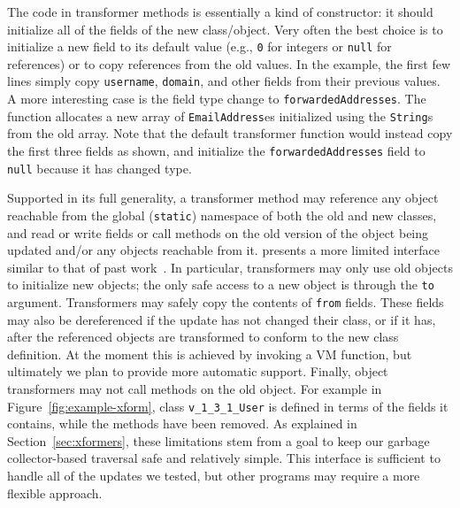 The code in transformer methods is essentially a kind of constructor:
it should initialize all of the fields of the new class/object.  Very
often the best choice is to initialize a new field to its default
value (e.g., \texttt{0} for integers or \texttt{null} for references)
or to copy references from the old values.  In the example, the first
few lines simply copy \texttt{username}, \texttt{domain}, and other
fields from their previous values.  A more interesting case is the
field type change to \texttt{forwardedAddresses}. %
The
function allocates a new array of \texttt{EmailAddress}es
initialized using the \texttt{String}s from the old array.  Note that
the default transformer function would instead copy the first three
fields as shown, and initialize the \texttt{forwardedAddresses} field
to \texttt{null} because it has changed type.

Supported in its full generality, a transformer method may
reference any object reachable from the global (\texttt{static})
namespace of both the old and new classes, and read or write fields or
call methods on the old version of the object being updated and/or any
objects reachable from it.  \DSU{} presents a more limited interface
similar to that of past work~\cite{ritzau00dynamic,Mala00a}.  In
particular, transformers may only use old objects to initialize new
objects; the only safe access to a new object is through the
\texttt{to} argument.  Transformers may safely copy the contents of
\texttt{from} fields.  These fields may also be dereferenced if the
update has not changed their class, or if it has, after
the referenced objects are transformed to conform to the new class
definition.   At the moment this is achieved by invoking a VM function,
but ultimately we plan to provide more automatic support.
Finally, object transformers may not call methods
on the old object. For example in Figure~\ref{fig:example-xform},
class \texttt{v\_1\_3\_1\_User} is defined in terms of the fields it
contains,  while the methods have been removed.  As explained in
Section~\ref{sec:xformers}, these limitations stem from a goal to keep
our garbage collector-based traversal safe and relatively simple.
This interface is sufficient to handle all of the updates we tested, but
other programs may require a more flexible approach. 

